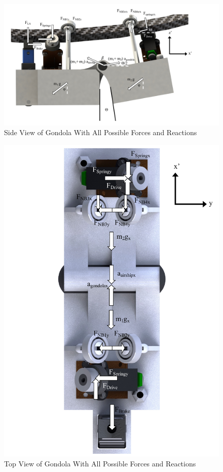 \documentclass[../main.tex]{subfiles}
\begin{document}
\begin{figure}[H]
	\centering
	\includegraphics[width=1\linewidth]{img/gondola/bentGondolaSideAllForces.pdf}
	\caption{Side View of Gondola With All Possible Forces and Reactions}
	\label{fig:bentGondolaSideAllForce}
\end{figure}
\begin{figure}[H]
	\centering
	\includegraphics[width=1\textwidth]{img/gondola/bentGondolaTopAllForces.pdf}
	\caption{Top View of Gondola With All Possible Forces and Reactions}
	\label{fig:bentGondolaTopAllForce}
\end{figure}
\end{document}
